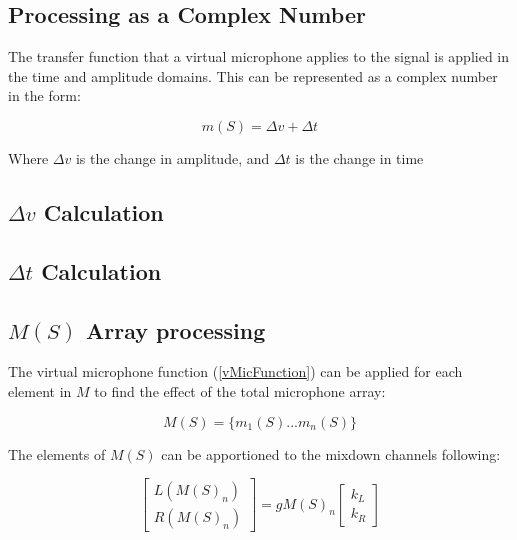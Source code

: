 \subsection{Processing as a Complex Number}

The transfer function that a virtual microphone applies to the signal is applied in the time and amplitude domains. This can be represented as a complex number in the form:

\begin{equation}\label{vMicFunction}
	m(S) = \Delta{}v + \Delta{}t
\end{equation}

Where $\Delta v$ is the change in amplitude, and $\Delta t$ is the change in time

\subsection{$\Delta{}v$ Calculation}



\subsection{$\Delta{}t$ Calculation}



\subsection{$M(S)$ Array processing}

The virtual microphone function (\ref{vMicFunction}) can be applied for each element in $M$ to find the effect of the total microphone array:

\begin{equation}
	M(S) = \{m_1(S) ... m_n(S)\}
\end{equation}

The elements of $M(S)$ can be apportioned to the mixdown channels following:

\begin{equation}\label{output}
	\begin{bmatrix} L(M(S)_n) \\ R(M(S)_n) \end{bmatrix} = gM(S)_n \begin{bmatrix} k_L \\ k_R \end{bmatrix}
\end{equation}


